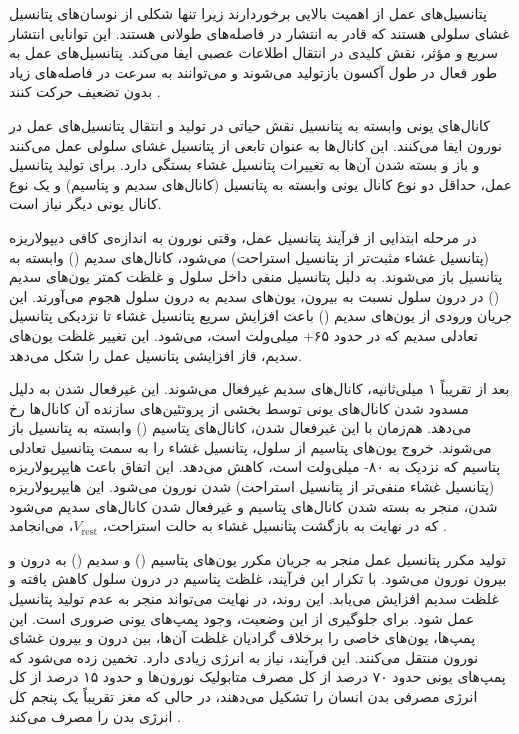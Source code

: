پتانسیل‌های عمل از اهمیت بالایی برخوردارند زیرا تنها شکلی از نوسان‌های پتانسیل غشای سلولی هستند که قادر به انتشار در فاصله‌های طولانی هستند.
این توانایی انتشار سریع و مؤثر، نقش کلیدی در انتقال اطلاعات عصبی ایفا می‌کند.
پتانسیل‌های عمل به طور فعال در طول آکسون بازتولید می‌شوند و می‌توانند به سرعت در فاصله‌های زیاد بدون تضعیف حرکت کنند
\cite{dayan2001}.

کانال‌های یونی وابسته به پتانسیل نقش حیاتی در تولید و انتقال پتانسیل‌های عمل در نورون ایفا می‌کنند.
این کانال‌ها به عنوان تابعی از پتانسیل غشای سلولی عمل می‌کنند و باز و بسته شدن آن‌ها به تغییرات پتانسیل غشاء بستگی دارد.
برای تولید پتانسیل عمل، حداقل دو نوع کانال یونی وابسته به پتانسیل (کانال‌های سدیم و پتاسیم) و یک نوع کانال یونی دیگر نیاز است.

در مرحله ابتدایی از فرآیند پتانسیل عمل، وقتی نورون به اندازه‌ی کافی دیپولاریزه (پتانسیل غشاء مثبت‌تر از پتانسیل استراحت) می‌شود، کانال‌های سدیم
()
وابسته به پتانسیل باز می‌شوند.
به دلیل پتانسیل منفی داخل سلول و غلظت کمتر یون‌های سدیم
()
در درون سلول نسبت به بیرون، یون‌های سدیم به درون سلول هجوم می‌آورند.
این جریان ورودی از یون‌های سدیم
()
باعث افزایش سریع پتانسیل غشاء تا نزدیکی پتانسیل تعادلی سدیم که در حدود ۶۵+ میلی‌ولت است، می‌شود.
این تغییر غلظت یون‌های سدیم، فاز افزایشی پتانسیل عمل را شکل می‌دهد.

بعد از تقریباً ۱ میلی‌ثانیه، کانال‌های سدیم غیرفعال می‌شوند.
این غیرفعال شدن به دلیل مسدود شدن کانال‌های یونی توسط بخشی از پروتئین‌های سازنده آن کانال‌ها رخ می‌دهد.
هم‌زمان با این غیرفعال شدن، کانال‌های پتاسیم
()
وابسته به پتانسیل باز می‌شوند.
خروج یون‌های پتاسیم از سلول، پتانسیل غشاء را به سمت پتانسیل تعادلی پتاسیم که نزدیک به ۸۰- میلی‌ولت است، کاهش می‌دهد.
این اتفاق باعث هایپرپولاریزه (پتانسیل غشاء منفی‌تر از پتانسیل استراحت) شدن نورون می‌شود.
این هایپرپولاریزه شدن، منجر به بسته شدن کانال‌های پتاسیم و غیرفعال شدن کانال‌های سدیم می‌شود که در نهایت به بازگشت پتانسیل غشاء به حالت استراحت،
\( V_{\text{rest}} \)،
می‌انجامد
\cite{trappenberg2022}.

تولید مکرر پتانسیل عمل منجر به جریان مکرر یون‌های پتاسیم
()
و سدیم
()
به درون و بیرون نورون می‌شود.
با تکرار این فرآیند، غلظت پتاسیم در درون سلول کاهش یافته و غلظت سدیم افزایش می‌یابد.
این روند، در نهایت می‌تواند منجر به عدم تولید پتانسیل عمل شود.
برای جلوگیری از این وضعیت، وجود پمپ‌های یونی ضروری است.
این پمپ‌ها، یون‌های خاصی را برخلاف گرادیان غلظت آن‌ها، بین درون و بیرون غشای نورون منتقل می‌کنند.
این فرآیند، نیاز به انرژی زیادی دارد.
تخمین زده می‌شود که پمپ‌های یونی حدود ۷۰ درصد از کل مصرف متابولیک نورون‌ها و حدود ۱۵ درصد از کل انرژی مصرفی بدن انسان را تشکیل می‌دهند، در حالی که مغز تقریباً یک پنجم کل انرژی بدن را مصرف می‌کند
\cite{trappenberg2022}.

